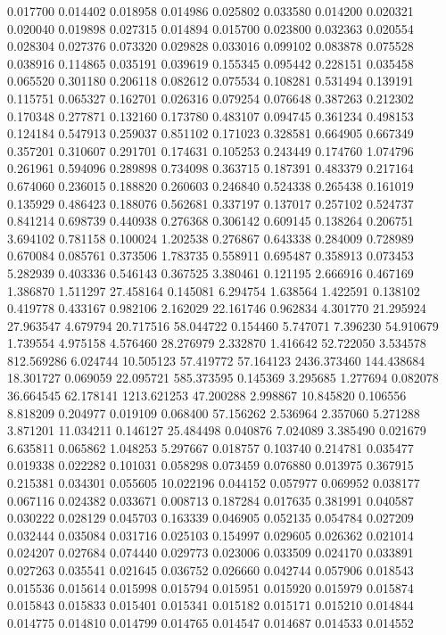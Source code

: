 0.017700
0.014402
0.018958
0.014986
0.025802
0.033580
0.014200
0.020321
0.020040
0.019898
0.027315
0.014894
0.015700
0.023800
0.032363
0.020554
0.028304
0.027376
0.073320
0.029828
0.033016
0.099102
0.083878
0.075528
0.038916
0.114865
0.035191
0.039619
0.155345
0.095442
0.228151
0.035458
0.065520
0.301180
0.206118
0.082612
0.075534
0.108281
0.531494
0.139191
0.115751
0.065327
0.162701
0.026316
0.079254
0.076648
0.387263
0.212302
0.170348
0.277871
0.132160
0.173780
0.483107
0.094745
0.361234
0.498153
0.124184
0.547913
0.259037
0.851102
0.171023
0.328581
0.664905
0.667349
0.357201
0.310607
0.291701
0.174631
0.105253
0.243449
0.174760
1.074796
0.261961
0.594096
0.289898
0.734098
0.363715
0.187391
0.483379
0.217164
0.674060
0.236015
0.188820
0.260603
0.246840
0.524338
0.265438
0.161019
0.135929
0.486423
0.188076
0.562681
0.337197
0.137017
0.257102
0.524737
0.841214
0.698739
0.440938
0.276368
0.306142
0.609145
0.138264
0.206751
3.694102
0.781158
0.100024
1.202538
0.276867
0.643338
0.284009
0.728989
0.670084
0.085761
0.373506
1.783735
0.558911
0.695487
0.358913
0.073453
5.282939
0.403336
0.546143
0.367525
3.380461
0.121195
2.666916
0.467169
1.386870
1.511297
27.458164
0.145081
6.294754
1.638564
1.422591
0.138102
0.419778
0.433167
0.982106
2.162029
22.161746
0.962834
4.301770
21.295924
27.963547
4.679794
20.717516
58.044722
0.154460
5.747071
7.396230
54.910679
1.739554
4.975158
4.576460
28.276979
2.332870
1.416642
52.722050
3.534578
812.569286
6.024744
10.505123
57.419772
57.164123
2436.373460
144.438684
18.301727
0.069059
22.095721
585.373595
0.145369
3.295685
1.277694
0.082078
36.664545
62.178141
1213.621253
47.200288
2.998867
10.845820
0.106556
8.818209
0.204977
0.019109
0.068400
57.156262
2.536964
2.357060
5.271288
3.871201
11.034211
0.146127
25.484498
0.040876
7.024089
3.385490
0.021679
6.635811
0.065862
1.048253
5.297667
0.018757
0.103740
0.214781
0.035477
0.019338
0.022282
0.101031
0.058298
0.073459
0.076880
0.013975
0.367915
0.215381
0.034301
0.055605
10.022196
0.044152
0.057977
0.069952
0.038177
0.067116
0.024382
0.033671
0.008713
0.187284
0.017635
0.381991
0.040587
0.030222
0.028129
0.045703
0.163339
0.046905
0.052135
0.054784
0.027209
0.032444
0.035084
0.031716
0.025103
0.154997
0.029605
0.026362
0.021014
0.024207
0.027684
0.074440
0.029773
0.023006
0.033509
0.024170
0.033891
0.027263
0.035541
0.021645
0.036752
0.026660
0.042744
0.057906
0.018543
0.015536
0.015614
0.015998
0.015794
0.015951
0.015920
0.015979
0.015874
0.015843
0.015833
0.015401
0.015341
0.015182
0.015171
0.015210
0.014844
0.014775
0.014810
0.014799
0.014765
0.014547
0.014687
0.014533
0.014552
